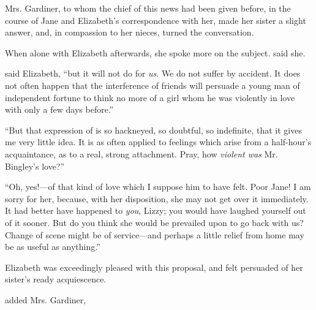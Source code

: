 Mrs. Gardiner, to whom the chief of this news had been given before, in the course of Jane and Elizabeth's correspondence with her, made her sister a slight answer, and, in compassion to her nieces, turned the conversation.

When alone with Elizabeth afterwards, she spoke more on the subject.  said she. 

 said Elizabeth, “but it will not do for {\em us}. We do not suffer by accident. It does not often happen that the interference of friends will persuade a young man of independent fortune to think no more of a girl whom he was violently in love with only a few days before.”

“But that expression of  is so hackneyed, so doubtful, so indefinite, that it gives me very little idea. It is as often applied to feelings which arise from a half-hour's acquaintance, as to a real, strong attachment. Pray, how {\em violent was} Mr. Bingley's love?”


“Oh, yes!---of that kind of love which I suppose him to have felt. Poor Jane! I am sorry for her, because, with her disposition, she may not get over it immediately. It had better have happened to {\em you}, Lizzy; you would have laughed yourself out of it sooner. But do you think she would be prevailed upon to go back with us? Change of scene might be of service---and perhaps a little relief from home may be as useful as anything.”

Elizabeth was exceedingly pleased with this proposal, and felt persuaded of her sister's ready acquiescence.

 added Mrs. Gardiner, 


